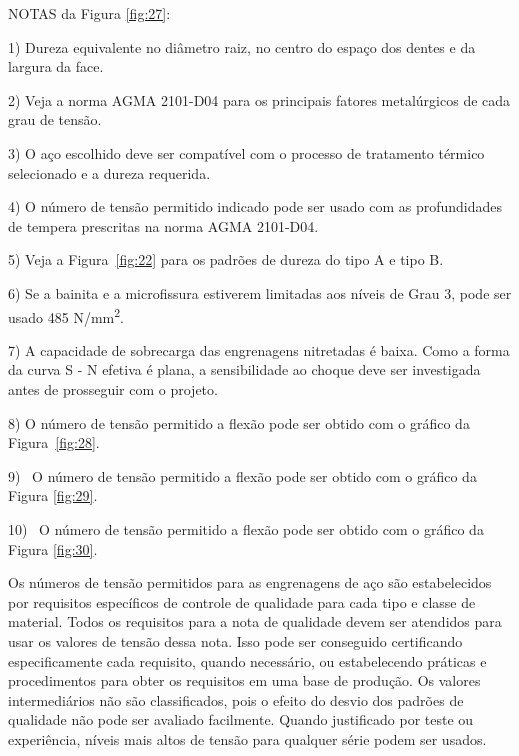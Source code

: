 \documentclass[12pt,a4paper]{article}
\begin{document}
NOTAS da Figura \ref{fig:27}:

1) Dureza equivalente no diâmetro raiz, no centro do espaço dos dentes e
da largura da face.

2) Veja a norma AGMA 2101-D04 para os principais fatores metalúrgicos de
cada grau de tensão.

3) O aço escolhido deve ser compatível com o processo de tratamento
térmico selecionado e a dureza requerida.

4) O número de tensão permitido indicado pode ser usado com as
profundidades de tempera prescritas na norma AGMA 2101-D04.

5) Veja a Figura~{\ref{fig:22}} para os padrões de
dureza do tipo A e tipo B.

6) Se a bainita e a microfissura estiverem limitadas aos níveis de Grau
3, pode ser usado 485 N/mm\textsuperscript{2}.

7) A capacidade de sobrecarga das engrenagens nitretadas é baixa. Como a
forma da curva S - N efetiva é plana, a sensibilidade ao choque deve ser
investigada antes de prosseguir com o projeto.

8) O número de tensão permitido a flexão pode ser obtido com o gráfico
da Figura~{\ref{fig:28}}.

9)~ O número de tensão permitido a flexão pode ser obtido com o gráfico
da Figura {\ref{fig:29}}.

10)~ O número de tensão permitido a flexão pode ser obtido com o gráfico
da Figura {\ref{fig:30}}.

Os números de tensão permitidos para as engrenagens de aço são
estabelecidos por requisitos específicos de controle de qualidade para
cada tipo e classe de material. Todos os requisitos para a nota de
qualidade devem ser atendidos para usar os valores de tensão dessa nota.
Isso pode ser conseguido certificando especificamente cada requisito,
quando necessário, ou estabelecendo práticas e procedimentos para obter
os requisitos em uma base de produção. Os valores intermediários não são
classificados, pois o efeito do desvio dos padrões de qualidade não pode
ser avaliado facilmente. Quando justificado por teste ou experiência,
níveis mais altos de tensão para qualquer série podem ser usados.
\end{document}
